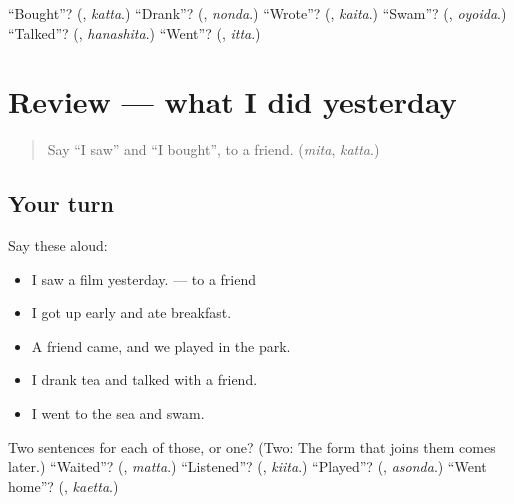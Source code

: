 \begin{tcolorbox}[breakable,colback=teal!4,colframe=teal!35!black,title={Before you move on}]
\textquotedblleft{}Bought\textquotedblright{}? (\textbf{}, \emph{katta}.) \textquotedblleft{}Drank\textquotedblright{}? (\textbf{}, \emph{nonda}.) \textquotedblleft{}Wrote\textquotedblright{}? (\textbf{}, \emph{kaita}.) \textquotedblleft{}Swam\textquotedblright{}? (\textbf{}, \emph{oyoida}.) \textquotedblleft{}Talked\textquotedblright{}? (\textbf{}, \emph{hanashita}.) \textquotedblleft{}Went\textquotedblright{}? (\textbf{}, \emph{itta}.)
\end{tcolorbox}
\section[(review)]{Review — what I did yesterday}

\label{lesson:JA-R250-what-i-did-yesterday}



\begin{quote}
Say \textquotedblleft{}I saw\textquotedblright{} and \textquotedblleft{}I bought\textquotedblright{}, to a friend. (\emph{mita}, \emph{katta}.)
\end{quote}

\subsection*{Your turn}
Say these aloud:

\begin{itemize}
\raggedright
  \item I saw a film yesterday. — to a friend
  \item I got up early and ate breakfast.
  \item A friend came, and we played in the park.
  \item I drank tea and talked with a friend.
  \item I went to the sea and swam.
\end{itemize}

\begin{tcolorbox}[breakable,colback=teal!4,colframe=teal!35!black,title={Before you move on}]
Two sentences for each of those, or one? (Two: \textbf{ } The form that joins them comes later.) \textquotedblleft{}Waited\textquotedblright{}? (\textbf{}, \emph{matta}.) \textquotedblleft{}Listened\textquotedblright{}? (\textbf{}, \emph{kiita}.) \textquotedblleft{}Played\textquotedblright{}? (\textbf{}, \emph{asonda}.) \textquotedblleft{}Went home\textquotedblright{}? (\textbf{}, \emph{kaetta}.)
\end{tcolorbox}
